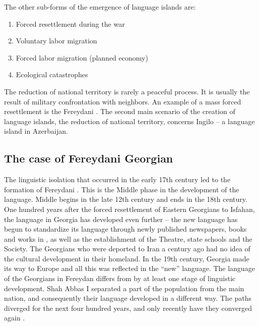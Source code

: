 \documentclass[output=paper,colorlinks,citecolor=brown,arabicfont,georgian]{langscibook}
\begin{document}
The other sub-forms of the emergence of language islands are:

\begin{enumerate}
    \item Forced resettlement during the war 
    \item Voluntary labor migration
    \item Forced labor migration (planned economy)
    \item Ecological catastrophes
\end{enumerate}

The reduction of national territory is rarely a peaceful process. It is usually the result of military confrontation with neighbors. An example of a mass forced resettlement is the Fereydani . The second main scenario of the creation of language islands, the reduction of national territory, concerns Ingilo  -- a  language island in Azerbaijan.

\subsection{The case of Fereydani Georgian}\label{3.8.ss.1.3}

The linguistic isolation that occurred in the early 17th century led to the formation of Fereydani  \citep{bakuradze_beridze_pourtskhvanidze2020}. This is the Middle  phase in the development of the  language. Middle  begins in the late 12th century and ends in the 18th century. One hundred years after the forced resettlement of Eastern Georgians to Isfahan, the  language in Georgia has developed even further -- the new  language has begun to standardize its language through newly published newspapers, books and works in , as well as the establishment of the  Theatre, state schools and the  Society. The Georgians who were deported to Iran a century ago had no idea of the cultural development in their homeland. In the 19th century, Georgia made its way to Europe and all this was reflected in the ``new''  language. The language of the Georgians in Fereydan differs from  by at least one stage of linguistic development. Shah Abbas I separated a part of the population from the main  nation, and consequently their language developed in a different way. The paths diverged for the next four hundred years, and only recently have they converged again \citep[494]{bakuradze_beridze_pourtskhvanidze2020}.
\end{document}
